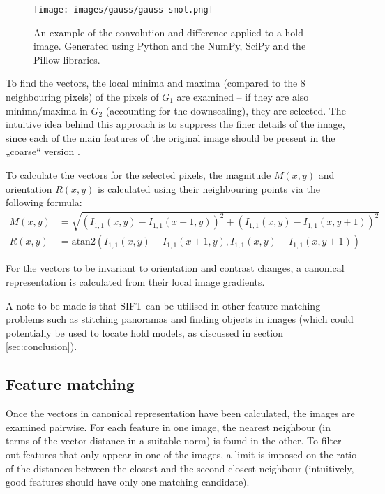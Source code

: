 \begin{figure}
	\centering
	\texttt{[image: images/gauss/gauss-smol.png]}
	\caption{An example of the convolution and difference applied to a hold image. Generated using Python and the NumPy, SciPy and the Pillow libraries.}
	\label{fig:gaussexample}
\end{figure}

To find the vectors, the local minima and maxima (compared to the 8 neighbouring pixels) of the pixels of $G_1$ are examined -- if they are also minima/maxima in $G_2$ (accounting for the downscaling), they are selected.
The intuitive idea behind this approach is to suppress the finer details of the image, since each of the main features of the original image should be present in the „coarse“ version \cite{scalespace}.

To calculate the vectors for the selected pixels, the magnitude $M(x,y)$ and orientation $R(x,y)$ is calculated using their neighbouring points via the following formula:
\begin{align}
	M(x,y) &= \sqrt{\left(I_{1,1}(x, y) - I_{1,1}(x + 1, y)\right)^2 + \left(I_{1,1}(x,y) - I_{1,1}(x, y + 1)\right)^2} \\[0.7em]
	R(x,y) &= \mathrm{atan2} \left(I_{1,1}(x, y) - I_{1,1}(x + 1, y), I_{1,1}(x,y) - I_{1,1}(x, y + 1)\right)
\end{align}

For the vectors to be invariant to orientation and contrast changes, a canonical representation is calculated from their local image gradients.

A note to be made is that SIFT can be utilised in other feature-matching problems such as stitching panoramas and finding objects in images (which could potentially be used to locate hold models, as discussed in section \ref{sec:conclusion}).

\subsection{Feature matching}
Once the vectors in canonical representation have been calculated, the images are examined pairwise.
For each feature in one image, the nearest neighbour (in terms of the vector distance in a suitable norm) is found in the other.
To filter out features that only appear in one of the images, a limit is imposed on the ratio of the distances between the closest and the second closest neighbour (intuitively, good features should have only one matching candidate).

